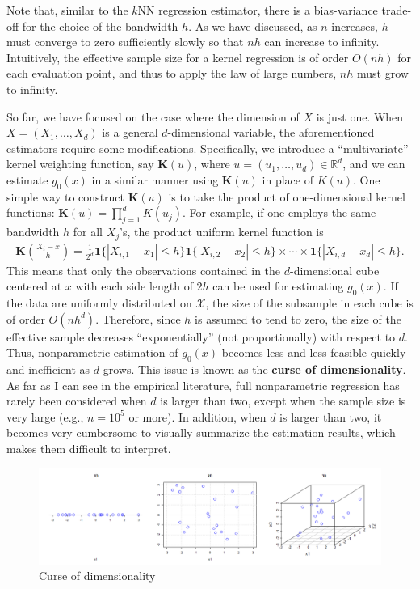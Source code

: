 \documentclass[10.5pt, A4paper, openany, uplatex]{book}
\newcommand{\mbf}{\mathbf}
\newcommand{\mcl}{\mathcal}
\numberwithin{equation}{section}
\begin{document}
Note that, similar to the $k$NN regression estimator, there is a bias-variance trade-off for the choice of the bandwidth $h$.
As we have discussed, as $n$ increases, $h$ must converge to zero sufficiently slowly so that $nh$ can increase to infinity.
Intuitively, the effective sample size for a kernel regression is of order $O(nh)$ for each evaluation point, and thus to apply the law of large numbers, $nh$ must grow to infinity.

\bigskip

So far, we have focused on the case where the dimension of $X$ is just one.
When $X = (X_1, \ldots, X_d)$ is a general $d$-dimensional variable, the aforementioned estimators require some modifications.
Specifically, we introduce a ``multivariate'' kernel weighting function, say $\mbf{K}(u)$, where $u = (u_1, \ldots, u_d) \in \mathbb{R}^d$, and we can estimate $g_0(x)$ in a similar manner using $\mbf{K}(u)$ in place of $K(u)$.
One simple way to construct $\mbf{K}(u)$ is to take the product of one-dimensional kernel functions: $\mbf{K}(u) = \prod_{j=1}^d K(u_j)$.
For example, if one employs the same bandwidth $h$ for all $X_j$'s, the product uniform kernel function is
\begin{align*}
	\mbf{K}\left(\frac{X_i - x}{h}\right) = \frac{1}{2^d}\mbf{1}\{|X_{i,1} - x_1| \le h\}\mbf{1}\{|X_{i,2} - x_2| \le h\} \times \cdots \times \mbf{1}\{|X_{i,d} - x_d| \le h\}.
\end{align*}
This means that only the observations contained in the $d$-dimensional cube centered at $x$ with each side length of $2h$ can be used for estimating $g_0(x)$.
If the data are uniformly distributed on $\mcl{X}$, the size of the subsample in each cube is of order $O(nh^d)$.
Therefore, since $h$ is assumed to tend to zero, the size of the effective sample decreases ``exponentially'' (not proportionally) with respect to $d$.
Thus, nonparametric estimation of $g_0(x)$ becomes less and less feasible quickly and inefficient as $d$ grows.
This issue is known as the \textbf{curse of dimensionality}.
As far as I can see in the empirical literature, full nonparametric regression has rarely been considered when $d$ is larger than two, except when the sample size is very large (e.g., $n = 10^5$ or more).
In addition, when $d$ is larger than two, it becomes very cumbersome to visually summarize the estimation results, which makes them difficult to interpret.

\begin{figure}[h!]
	\begin{center}
		\includegraphics[width = 18cm]{CoD.png}
		\caption{Curse of dimensionality}
	\end{center}
\end{figure}
\end{document}
